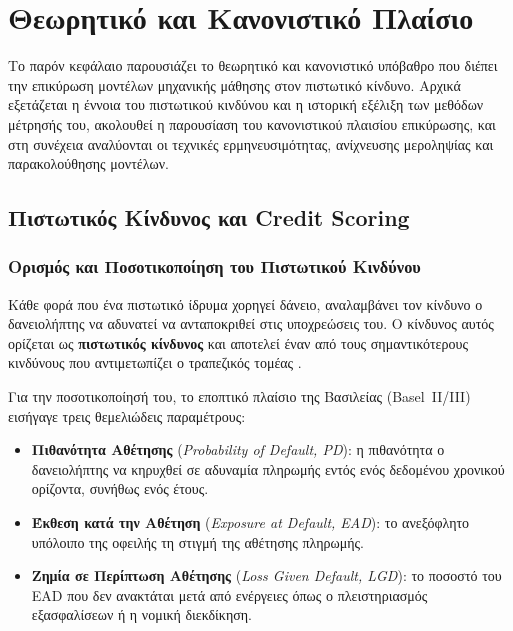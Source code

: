 \chapter{Θεωρητικό και Κανονιστικό Πλαίσιο}
\label{ch:theory}

Το παρόν κεφάλαιο παρουσιάζει το θεωρητικό και κανονιστικό υπόβαθρο
που διέπει την επικύρωση μοντέλων μηχανικής μάθησης στον πιστωτικό
κίνδυνο. Αρχικά εξετάζεται η έννοια του πιστωτικού κινδύνου και η
ιστορική εξέλιξη των μεθόδων μέτρησής του, ακολουθεί η παρουσίαση
του κανονιστικού πλαισίου επικύρωσης, και στη συνέχεια αναλύονται
οι τεχνικές ερμηνευσιμότητας, ανίχνευσης μεροληψίας και
παρακολούθησης μοντέλων.

\section{Πιστωτικός Κίνδυνος και Credit Scoring}
\label{sec:credit_risk}

\subsection{Ορισμός και Ποσοτικοποίηση του Πιστωτικού Κινδύνου}
\label{subsec:credit_risk_def}

Κάθε φορά που ένα πιστωτικό ίδρυμα χορηγεί δάνειο, αναλαμβάνει τον
κίνδυνο ο δανειολήπτης να αδυνατεί να ανταποκριθεί στις υποχρεώσεις
του. Ο κίνδυνος αυτός ορίζεται ως \textbf{πιστωτικός κίνδυνος} και
αποτελεί έναν από τους σημαντικότερους κινδύνους που αντιμετωπίζει ο
τραπεζικός τομέας \citep{basel2006}.

Για την ποσοτικοποίησή του, το εποπτικό πλαίσιο της Βασιλείας
(Basel~II/III) εισήγαγε τρεις θεμελιώδεις παραμέτρους:

\begin{itemize}
  \item \textbf{Πιθανότητα Αθέτησης} (\textit{Probability of Default,
  PD}): η πιθανότητα ο δανειολήπτης να κηρυχθεί σε αδυναμία πληρωμής
  εντός ενός δεδομένου χρονικού ορίζοντα, συνήθως ενός έτους.

  \item \textbf{Έκθεση κατά την Αθέτηση} (\textit{Exposure at Default,
  EAD}): το ανεξόφλητο υπόλοιπο της οφειλής τη στιγμή της αθέτησης
  πληρωμής.

  \item \textbf{Ζημία σε Περίπτωση Αθέτησης} (\textit{Loss Given
  Default, LGD}): το ποσοστό του EAD που δεν ανακτάται μετά από
  ενέργειες όπως ο πλειστηριασμός εξασφαλίσεων ή η νομική
  διεκδίκηση.
\end{itemize}

